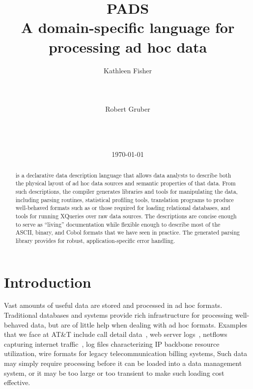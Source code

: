 \documentclass{sig-alternate}
\begin{document}
\title{PADS\\ A domain-specific language for processing ad hoc data}

\author{
\alignauthor Kathleen Fisher\\
       \\
       \\
       \\
\alignauthor Robert Gruber\\
       \\
       \\
       \\
}

\date{\today}
\maketitle
\begin{abstract}
\pads{} is a declarative data description language that allows data
analysts to describe both the physical layout of ad hoc data sources
and semantic properties of that data.  From such descriptions, the
\pads{} compiler generates libraries and tools for manipulating the
data, including parsing routines, statistical profiling tools,
translation programs to produce well-behaved
formats such as \xml{} or those required for loading relational
databases, and tools for running XQueries over raw \pads{} data sources.
The descriptions are concise enough to serve as ``living'' documentation
while flexible enough to describe most of the ASCII, binary, and
Cobol formats that we have seen in practice.  The generated parsing
library provides for robust, application-specific error handling.
\end{abstract}

\section{Introduction}
Vast amounts of useful data are stored and processed in ad hoc formats.
Traditional databases and \xml{} systems provide rich infrastructure
for processing well-behaved data, but are of little help when dealing with ad hoc formats.
Examples that we face at AT\&T include call detail data~\cite{kdd00}, 
web server logs~\cite{wpp}, 
netflows capturing internet traffic~\cite{netflow}, 
log files characterizing IP backbone resource utilization,
wire formats for legacy telecommunication billing systems, 
\etc{}
Such data may simply require processing before it can be loaded into a
data management system, or it may be too large or too transient to
make such loading cost effective.
\end{document}
